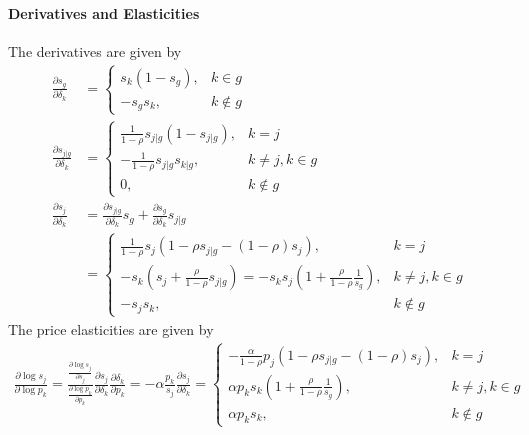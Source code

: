 \documentclass[11pt]{elegantbook}
\begin{document}
\paragraph*{Derivatives and Elasticities}
The derivatives are given by
\begin{equation}
    \begin{aligned}
        \frac{\partial s_g}{\partial \delta_k}&=\left\{\begin{matrix}
            s_k(1-s_g),&k\in g\\
            -s_gs_k,&k\notin g
        \end{matrix}\right.\\
        \frac{\partial s_{j|g}}{\partial \delta_k}&=\left\{\begin{matrix}
            \frac{1}{1-\rho}s_{j|g}(1-s_{j|g}),&k=j\\
            -\frac{1}{1-\rho}s_{j|g}s_{k|g},&k\neq j,k\in g\\
            0,&k\notin g
        \end{matrix}\right.\\
        \frac{\partial s_j}{\partial \delta_k}&=\frac{\partial s_{j|g}}{\partial \delta_k}s_g+\frac{\partial s_g}{\partial \delta_k}s_{j|g}\\
        &=\left\{\begin{matrix}
            \frac{1}{1-\rho}s_j\left(1-\rho s_{j|g}-(1-\rho)s_j\right),&k=j\\
            -s_k\left(s_j+\frac{\rho}{1-\rho}s_{j|g}\right)=-s_ks_j\left(1+\frac{\rho}{1-\rho}\frac{1}{s_g}\right),&k\neq j,k\in g\\
            -s_js_k,&k\notin g
        \end{matrix}\right.
    \end{aligned}
    \nonumber
\end{equation}
The price elasticities are given by
\begin{equation}
    \begin{aligned}
        \frac{\partial \log s_{j}}{\partial \log p_k}=\frac{\frac{\partial \log s_{j}}{\partial s_j}}{\frac{\partial \log p_k}{\partial p_k}}\frac{\partial s_j}{\partial \delta_k}\frac{\partial \delta_k}{\partial p_k}=-\alpha\frac{p_k}{s_j}\frac{\partial s_j}{\partial \delta_k}=
        \left\{\begin{matrix}
            -\frac{\alpha}{1-\rho}p_j\left(1-\rho s_{j|g}-(1-\rho)s_j\right),&k=j\\
            \alpha p_k s_k \left(1+\frac{\rho}{1-\rho}\frac{1}{s_g}\right),&k\neq j,k\in g\\
            \alpha p_k s_k,&k\notin g
        \end{matrix}\right.
    \end{aligned}
    \nonumber
\end{equation}
\end{document}
